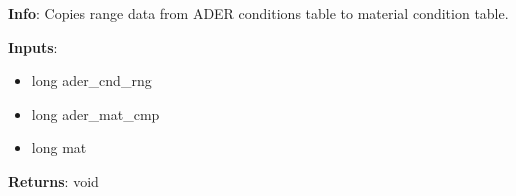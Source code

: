 \textbf{Info}: Copies range data from ADER conditions table to material
condition table.

\noindent \textbf{Inputs}:
\begin{itemize}
\item{long ader\_cnd\_rng}
\item{long ader\_mat\_cmp}
\item{long mat}
\end{itemize}

\noindent \textbf{Returns}: void
